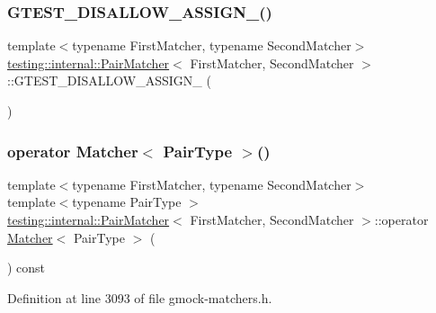 \subsubsection{\texorpdfstring{G\+T\+E\+S\+T\+\_\+\+D\+I\+S\+A\+L\+L\+O\+W\+\_\+\+A\+S\+S\+I\+G\+N\+\_\+()}{GTEST\_DISALLOW\_ASSIGN\_()}}
{\footnotesize\ttfamily template$<$typename First\+Matcher, typename Second\+Matcher$>$ \\
\hyperlink{classtesting_1_1internal_1_1PairMatcher}{testing\+::internal\+::\+Pair\+Matcher}$<$ First\+Matcher, Second\+Matcher $>$\+::G\+T\+E\+S\+T\+\_\+\+D\+I\+S\+A\+L\+L\+O\+W\+\_\+\+A\+S\+S\+I\+G\+N\+\_\+ (\begin{DoxyParamCaption}\item[{\hyperlink{classtesting_1_1internal_1_1PairMatcher}{Pair\+Matcher}$<$ First\+Matcher, Second\+Matcher $>$}]{ }\end{DoxyParamCaption})\hspace{0.3cm}{\ttfamily [private]}}

\mbox{\label{classtesting_1_1internal_1_1PairMatcher_ae9461cc22148c6b15ad94eb5ad7c8a50}} 
\subsubsection{\texorpdfstring{operator Matcher$<$ Pair\+Type $>$()}{operator Matcher< PairType >()}}
{\footnotesize\ttfamily template$<$typename First\+Matcher, typename Second\+Matcher$>$ \\
template$<$typename Pair\+Type $>$ \\
\hyperlink{classtesting_1_1internal_1_1PairMatcher}{testing\+::internal\+::\+Pair\+Matcher}$<$ First\+Matcher, Second\+Matcher $>$\+::operator \hyperlink{classtesting_1_1Matcher}{Matcher}$<$ Pair\+Type $>$ (\begin{DoxyParamCaption}{ }\end{DoxyParamCaption}) const\hspace{0.3cm}{\ttfamily [inline]}}



Definition at line 3093 of file gmock-\/matchers.\+h.



